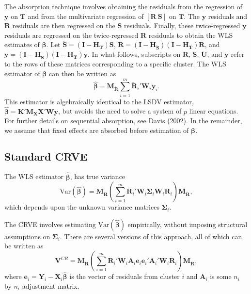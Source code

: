 \documentclass[12pt]{article}
\begin{document}
The absorption technique involves obtaining the residuals from the
regression of \(\mathbf{y}\) on \(\mathbf{T}\) and from the multivariate
regression of \([\mathbf{R} \ \mathbf{S}]\) on \(\mathbf{T}\). The
\(\mathbf{y}\) residuals and \(\mathbf{R}\) residuals are then regressed
on the \(\mathbf{S}\) residuals. Finally, these twice-regressed
\(\mathbf{y}\) residuals are regressed on the twice-regressed
\(\mathbf{R}\) residuals to obtain the WLS estimates of
\(\boldsymbol\beta\). Let
\(\mathbf{\ddot{S}} = \left(\mathbf{I} - \mathbf{H_T}\right)\mathbf{S}\),
\(\mathbf{\ddot{R}} = \left(\mathbf{I} - \mathbf{H_{\ddot{S}}}\right)\left(\mathbf{I} - \mathbf{H_T}\right)\mathbf{R}\),
and
\(\mathbf{\ddot{y}} = \left(\mathbf{I} - \mathbf{H_{\ddot{S}}}\right)\left(\mathbf{I} - \mathbf{H_T}\right)\mathbf{y}\).
In what follows, subscripts on \(\mathbf{\ddot{R}}\),
\(\mathbf{\ddot{S}}\), \(\mathbf{\ddot{U}}\), and \(\mathbf{\ddot{y}}\)
refer to the rows of these matrices corresponding to a specific cluster.
The WLS estimator of \(\boldsymbol\beta\) can then be written as
\begin{equation}
\label{eq:WLS}
\boldsymbol{\hat\beta} = \mathbf{M_{\ddot{R}}} \sum_{i=1}^m \mathbf{\ddot{R}}_i' \mathbf{W}_i \mathbf{\ddot{y}}_i. 
\end{equation} This estimator is algebraically identical to the LSDV
estimator,
\(\boldsymbol{\hat\beta} = \mathbf{K}'\mathbf{M_X} \mathbf{X}' \mathbf{W} \mathbf{y}\),
but avoids the need to solve a system of \(p\) linear equations. For
further details on sequential absorption, see Davis (2002). In the
remainder, we assume that fixed effects are absorbed before estimation
of \(\boldsymbol\beta\).

\hypertarget{standard-crve}{%
\subsection{Standard CRVE}\label{standard-crve}}

The WLS estimator \(\boldsymbol{\hat\beta}\), has true variance
\begin{equation}
\label{eq:var_WLS}
\text{Var}\left(\boldsymbol{\hat\beta}\right) = \mathbf{M_{\ddot{R}}}\left(\sum_{i=1}^m \mathbf{\ddot{R}}_i' \mathbf{W}_i \boldsymbol\Sigma_i \mathbf{W}_i\mathbf{\ddot{R}}_i\right) \mathbf{M_{\ddot{R}}},
\end{equation} which depends upon the unknown variance matrices
\(\boldsymbol\Sigma_i\).

The CRVE involves estimating
\(\text{Var}\left(\boldsymbol{\hat\beta}\right)\) empirically, without
imposing structural assumptions on \(\boldsymbol\Sigma_i\). There are
several versions of this approach, all of which can be written as
\begin{equation}
\label{eq:V_small}
\mathbf{V}^{CR} = \mathbf{M_{\ddot{R}}}\left(\sum_{i=1}^m \mathbf{\ddot{R}}_i'\mathbf{W}_i \mathbf{A}_i \mathbf{e}_i \mathbf{e}_i' \mathbf{A}_i' \mathbf{W}_i \mathbf{\ddot{R}}_i\right) \mathbf{M_{\ddot{R}}},
\end{equation} where
\(\mathbf{e}_i = \mathbf{Y}_i - \mathbf{X}_i \boldsymbol{\hat\beta}\) is
the vector of residuals from cluster \(i\) and \(\mathbf{A}_i\) is some
\(n_i\) by \(n_i\) adjustment matrix.
\end{document}
